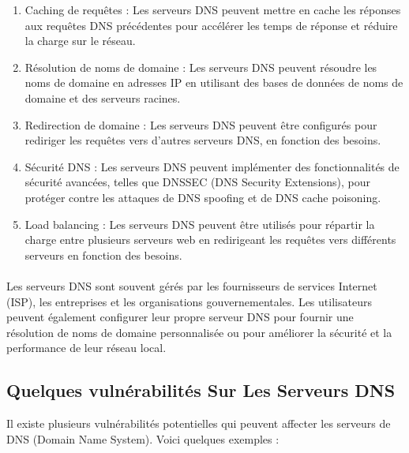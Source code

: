  \begin{enumerate}
	
	\item     Caching de requêtes : Les serveurs DNS peuvent mettre en cache les réponses aux requêtes DNS précédentes pour accélérer les temps de réponse et réduire la charge sur le réseau.
	 
	\item Résolution de noms de domaine : Les serveurs DNS peuvent résoudre les noms de domaine en adresses IP en utilisant des bases de données de noms de domaine et des serveurs racines.
	 
	 \item Redirection de domaine : Les serveurs DNS peuvent être configurés pour rediriger les requêtes vers d'autres serveurs DNS, en fonction des besoins.
	 
	 \item Sécurité DNS : Les serveurs DNS peuvent implémenter des fonctionnalités de sécurité avancées, telles que DNSSEC (DNS Security Extensions), pour protéger contre les attaques de DNS spoofing et de DNS cache poisoning.
	 
	 \item Load balancing : Les serveurs DNS peuvent être utilisés pour répartir la charge entre plusieurs serveurs web en redirigeant les requêtes vers différents serveurs en fonction des besoins.
	 
\end{enumerate}
\paragraph{ }
Les serveurs DNS sont souvent gérés par les fournisseurs de services Internet (ISP), les entreprises et les organisations gouvernementales. Les utilisateurs peuvent également configurer leur propre serveur DNS pour fournir une résolution de noms de domaine personnalisée ou pour améliorer la sécurité et la performance de leur réseau local.
\subsection{Quelques vulnérabilités Sur Les Serveurs DNS }

Il existe plusieurs vulnérabilités potentielles qui peuvent affecter les serveurs de DNS (Domain Name System). Voici quelques exemples :\\

